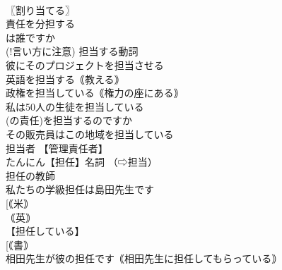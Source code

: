 \documentclass[8pt]{extreport}
\begin{document}
\begin{CJK}{UTF8}{min}
\\	〖割り当てる〗
\\	責任を分担する 
\\	[｟やや書｠ 
\\	費用（ひよう）を分担する 
\\	その仕事を我々4人で分担しよう 
\\	になう【担う】 
\\	【引き受ける】 
\\	重要な役割を担う 
\\	(!後の方は口語的) 
\\	日本は国際的な責任を担うべきだ 
\\	日本の将来は君たちが担っている 
\\	彼は私たちの期待を担っている 
\\	【背負う】 
\\	かつぎあげる【担ぎ上げる】 
\\	肩に担ぎ上げる 
\\	重いいすを2階へ担ぎ上げる 
\\	彼女を生徒会の会長に担ぎ上げる｟押し立てる｠ 
\\	たんか【担架】 
\\	【台車付きの】｟米｠
\\	担架で運ぶ 
\\	たんとう【担当】 
\\	君の担当の医者[先生]は誰ですか 
\\	(!言い方に注意) 担当する動詞 
\\	彼にそのプロジェクトを担当させる 
\\	英語を担当する｟教える｠ 
\\	政権を担当している｟権力の座にある｠ 
\\	私は50人の生徒を担当している 
\\	[｟書｠ 
\\	（⇨担任） 
\\	だれがその実験[部門](の責任)を担当するのですか 
\\	その販売員はこの地域を担当している 
\\	担当者 【管理責任者】
\\	たんにん【担任】名詞 （⇨担当） 
\\	担任の教師 
\\	私たちの学級担任は島田先生です 
\\	[｟米｠ 
\\	｟英｠ 
\\	【担任している】
\\	[｟書｠ 
\\	相田先生が彼の担任です｟相田先生に担任してもらっている｠ 

\end{CJK}
\end{document}
